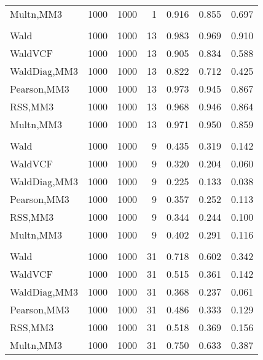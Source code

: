 \documentclass[
]{article}
\begin{document}
\begin{table}[H]
{\begin{tabular}[t]{lrrrrrr}
\hspace{1em}Multn,MM3 & 1000 & 1000 & 1 & 0.916 & 0.855 & 0.697\\
\addlinespace[0.3em]
\multicolumn{7}{l}{\textbf{1F 15V}}\\
\hspace{1em}Wald & 1000 & 1000 & 13 & 0.983 & 0.969 & 0.910\\
\hspace{1em}WaldVCF & 1000 & 1000 & 13 & 0.905 & 0.834 & 0.588\\
\hspace{1em}WaldDiag,MM3 & 1000 & 1000 & 13 & 0.822 & 0.712 & 0.425\\
\hspace{1em}Pearson,MM3 & 1000 & 1000 & 13 & 0.973 & 0.945 & 0.867\\
\hspace{1em}RSS,MM3 & 1000 & 1000 & 13 & 0.968 & 0.946 & 0.864\\
\hspace{1em}Multn,MM3 & 1000 & 1000 & 13 & 0.971 & 0.950 & 0.859\\
\addlinespace[0.3em]
\multicolumn{7}{l}{\textbf{2F 10V}}\\
\hspace{1em}Wald & 1000 & 1000 & 9 & 0.435 & 0.319 & 0.142\\
\hspace{1em}WaldVCF & 1000 & 1000 & 9 & 0.320 & 0.204 & 0.060\\
\hspace{1em}WaldDiag,MM3 & 1000 & 1000 & 9 & 0.225 & 0.133 & 0.038\\
\hspace{1em}Pearson,MM3 & 1000 & 1000 & 9 & 0.357 & 0.252 & 0.113\\
\hspace{1em}RSS,MM3 & 1000 & 1000 & 9 & 0.344 & 0.244 & 0.100\\
\hspace{1em}Multn,MM3 & 1000 & 1000 & 9 & 0.402 & 0.291 & 0.116\\
\addlinespace[0.3em]
\multicolumn{7}{l}{\textbf{3F 15V}}\\
\hspace{1em}Wald & 1000 & 1000 & 31 & 0.718 & 0.602 & 0.342\\
\hspace{1em}WaldVCF & 1000 & 1000 & 31 & 0.515 & 0.361 & 0.142\\
\hspace{1em}WaldDiag,MM3 & 1000 & 1000 & 31 & 0.368 & 0.237 & 0.061\\
\hspace{1em}Pearson,MM3 & 1000 & 1000 & 31 & 0.486 & 0.333 & 0.129\\
\hspace{1em}RSS,MM3 & 1000 & 1000 & 31 & 0.518 & 0.369 & 0.156\\
\hspace{1em}Multn,MM3 & 1000 & 1000 & 31 & 0.750 & 0.633 & 0.387\\
\bottomrule
\end{tabular}}
\endgroup{}
\end{table}
\end{document}
